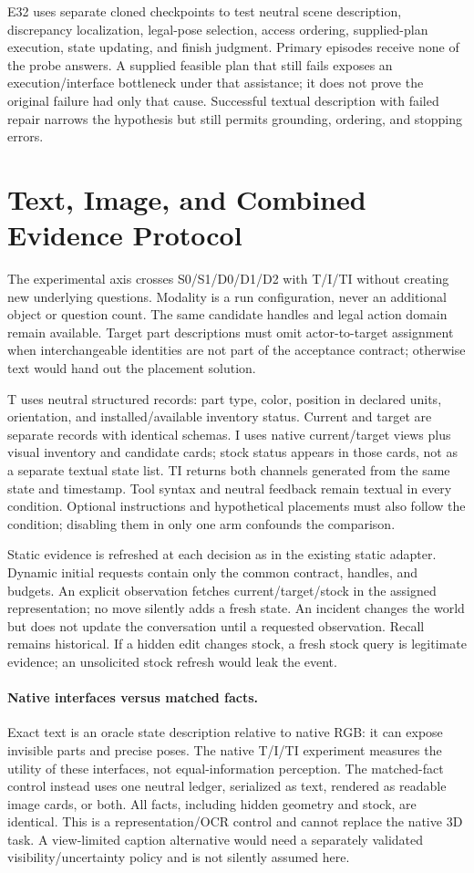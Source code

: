 \documentclass[10pt,twocolumn,letterpaper]{article}
\begin{document}
E32 uses separate cloned checkpoints to test neutral scene description, discrepancy localization, legal-pose selection, access ordering, supplied-plan execution, state updating, and finish judgment. Primary episodes receive none of the probe answers. A supplied feasible plan that still fails exposes an execution/interface bottleneck under that assistance; it does not prove the original failure had only that cause. Successful textual description with failed repair narrows the hypothesis but still permits grounding, ordering, and stopping errors.

\section{Text, Image, and Combined Evidence Protocol}
The experimental axis crosses S0/S1/D0/D1/D2 with T/I/TI without creating new underlying questions. Modality is a run configuration, never an additional object or question count. The same candidate handles and legal action domain remain available. Target part descriptions must omit actor-to-target assignment when interchangeable identities are not part of the acceptance contract; otherwise text would hand out the placement solution.

T uses neutral structured records: part type, color, position in declared units, orientation, and installed/available inventory status. Current and target are separate records with identical schemas. I uses native current/target views plus visual inventory and candidate cards; stock status appears in those cards, not as a separate textual state list. TI returns both channels generated from the same state and timestamp. Tool syntax and neutral feedback remain textual in every condition. Optional instructions and hypothetical placements must also follow the condition; disabling them in only one arm confounds the comparison.

Static evidence is refreshed at each decision as in the existing static adapter. Dynamic initial requests contain only the common contract, handles, and budgets. An explicit observation fetches current/target/stock in the assigned representation; no move silently adds a fresh state. An incident changes the world but does not update the conversation until a requested observation. Recall remains historical. If a hidden edit changes stock, a fresh stock query is legitimate evidence; an unsolicited stock refresh would leak the event.

\paragraph{Native interfaces versus matched facts.}
Exact text is an oracle state description relative to native RGB: it can expose invisible parts and precise poses. The native T/I/TI experiment measures the utility of these interfaces, not equal-information perception. The matched-fact control instead uses one neutral ledger, serialized as text, rendered as readable image cards, or both. All facts, including hidden geometry and stock, are identical. This is a representation/OCR control and cannot replace the native 3D task. A view-limited caption alternative would need a separately validated visibility/uncertainty policy and is not silently assumed here.
\end{document}
